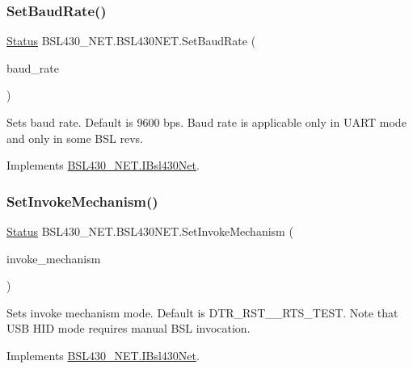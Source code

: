 \subsubsection{\texorpdfstring{SetBaudRate()}{SetBaudRate()}}
{\footnotesize\ttfamily \mbox{\hyperlink{class_b_s_l430___n_e_t_1_1_status}{Status}} B\+S\+L430\+\_\+\+N\+E\+T.\+B\+S\+L430\+N\+E\+T.\+Set\+Baud\+Rate (\begin{DoxyParamCaption}\item[{\mbox{\hyperlink{namespace_b_s_l430___n_e_t_a8d30c263598635a481840944d38aeb70}{Baud\+Rate}}}]{baud\+\_\+rate }\end{DoxyParamCaption})}



Sets baud rate. Default is 9600 bps. Baud rate is applicable only in U\+A\+RT mode and only in some B\+SL revs. 



Implements \mbox{\hyperlink{interface_b_s_l430___n_e_t_1_1_i_bsl430_net_a4ce151c0bd961d76dc9dfa2b07788b99}{B\+S\+L430\+\_\+\+N\+E\+T.\+I\+Bsl430\+Net}}.

\mbox{\label{class_b_s_l430___n_e_t_1_1_b_s_l430_n_e_t_ad8ec7dceb979a98e30bf59f7c5fde620}} 
\subsubsection{\texorpdfstring{SetInvokeMechanism()}{SetInvokeMechanism()}}
{\footnotesize\ttfamily \mbox{\hyperlink{class_b_s_l430___n_e_t_1_1_status}{Status}} B\+S\+L430\+\_\+\+N\+E\+T.\+B\+S\+L430\+N\+E\+T.\+Set\+Invoke\+Mechanism (\begin{DoxyParamCaption}\item[{\mbox{\hyperlink{namespace_b_s_l430___n_e_t_a6571fdf0fbbc8408b8428f4d642c1305}{Invoke\+Mechanism}}}]{invoke\+\_\+mechanism }\end{DoxyParamCaption})}



Sets invoke mechanism mode. Default is D\+T\+R\+\_\+\+R\+S\+T\+\_\+\+\_\+\+R\+T\+S\+\_\+\+T\+E\+ST. Note that U\+SB H\+ID mode requires manual B\+SL invocation. 



Implements \mbox{\hyperlink{interface_b_s_l430___n_e_t_1_1_i_bsl430_net_a5edac897ededd878d53097ac4e9c6782}{B\+S\+L430\+\_\+\+N\+E\+T.\+I\+Bsl430\+Net}}.

